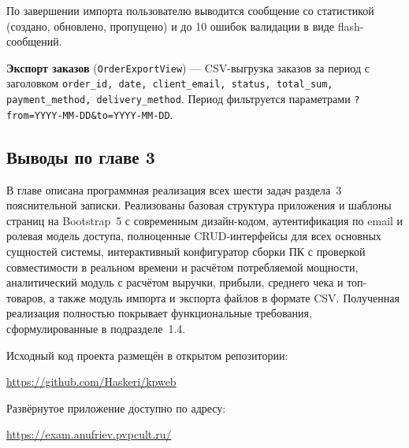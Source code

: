 По завершении импорта пользователю выводится сообщение со статистикой (создано, обновлено, пропущено) и до 10 ошибок валидации в виде flash-сообщений.

\textbf{Экспорт заказов} (\texttt{OrderExportView}) --- CSV-выгрузка заказов за период с заголовком \texttt{order\_id, date, client\_email, status, total\_sum, payment\_method, delivery\_method}. Период фильтруется параметрами \texttt{?from=YYYY-MM-DD\&to=YYYY-MM-DD}.

\subsection*{Выводы по главе 3}

В главе описана программная реализация всех шести задач раздела~3 пояснительной записки. Реализованы базовая структура приложения и шаблоны страниц на Bootstrap~5 с современным дизайн-кодом, аутентификация по email и ролевая модель доступа, полноценные CRUD-интерфейсы для всех основных сущностей системы, интерактивный конфигуратор сборки ПК с проверкой совместимости в реальном времени и расчётом потребляемой мощности, аналитический модуль с расчётом выручки, прибыли, среднего чека и топ-товаров, а также модуль импорта и экспорта файлов в формате CSV. Полученная реализация полностью покрывает функциональные требования, сформулированные в подразделе~1.4.

Исходный код проекта размещён в открытом репозитории:
\begin{center}
    \url{https://github.com/Haskeri/kpweb}
\end{center}

Развёрнутое приложение доступно по адресу:
\begin{center}
    \url{https://exam.anufriev.pvpcult.ru/}
\end{center}
